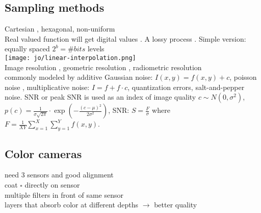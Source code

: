 \subsection*{Sampling methods}
Cartesian , hexagonal, non-uniform\\
 Real valued function will get digital values . A lossy process . Simple version: equally spaced $2^b = \#bits$ levels\\
\texttt{[image: jo/linear-interpolation.png]} \\ 
 Image resolution , geometric resolution , radiometric resolution \\
 commonly modeled by additive Gaussian noise: $I(x, y) = f(x, y) + c$, poisson noise , multiplicative noise: $I = f + f \cdot c$, quantization errors, salt-and-pepper noise. SNR or peak SNR is used as an index of image quality $c \sim N(0, \sigma^2)$, $p(c) = \frac{1}{\sigma \sqrt{2\pi}} \cdot \exp\left(-\frac{(c - \mu)^2}{2\sigma^2}\right)$, SNR: $S = \frac{F}{\sigma}$ where $F = \frac{1}{XY}\sum_{x = 1}^X \sum_{y = 1}^{Y} f(x, y)$.
\subsection*{Color cameras}
 need 3 sensors and good alignment\\
 coat $\square$ directly on sensor \\
 multiple filters in front of same sensor\\
 layers that absorb color at different depths $\rightarrow$ better quality